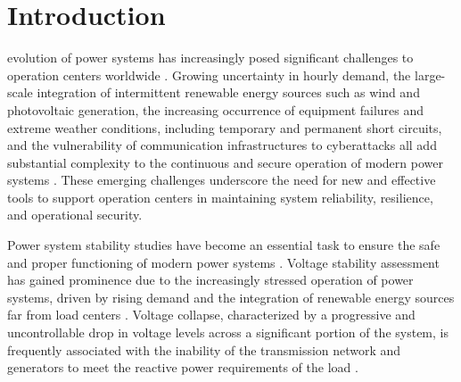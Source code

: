 \documentclass{ieeeaccess}
\begin{document}
\titlepgskip=-21pt

\maketitle

\section{Introduction}
\label{sec:introduction}

 evolution of power systems has increasingly posed significant challenges to operation centers worldwide \cite{Bhusal2020}. Growing uncertainty in hourly demand, the large-scale integration of intermittent renewable energy sources such as wind and photovoltaic generation, the increasing occurrence of equipment failures and extreme weather conditions, including temporary and permanent short circuits, and the vulnerability of communication infrastructures to cyberattacks all add substantial complexity to the continuous and secure operation of modern power systems \cite{Pastrana2025,Rifat2025,AlRousan2025,Manias2024,Ali2024,Hashemi2025}. These emerging challenges underscore the need for new and effective tools to support operation centers in maintaining system reliability, resilience, and operational security.

Power system stability studies have become an essential task to ensure the safe and proper functioning of modern power systems \cite{Hatziargyriou2021}. Voltage stability assessment has gained prominence due to the increasingly stressed operation of power systems, driven by rising demand and the integration of renewable energy sources far from load centers \cite{Sun2019}. Voltage collapse, characterized by a progressive and uncontrollable drop in voltage levels across a significant portion of the system, is frequently associated with the inability of the transmission network and generators to meet the reactive power requirements of the load \cite{kundur1994power,cutsem2007voltage}.
\end{document}
